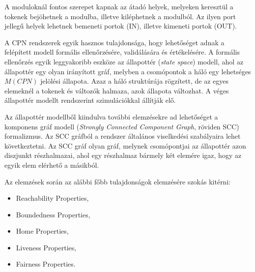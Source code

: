 A moduloknál fontos szerepet kapnak az átadó helyek, melyeken keresztül a tokenek bejöhetnek a modulba, illetve kiléphetnek a modulból. Az ilyen port jellegű helyek lehetnek bemeneti portok (IN), illetve kimeneti portok (OUT).  

A CPN rendszerek egyik hasznos tulajdonsága, hogy lehetőséget adnak a felépített modell formális ellenőrzésére, validálására és értékelésére. A formális ellenőrzés egyik leggyakoribb eszköze az állapottér (\textit{state space})  modell, ahol az állapottér egy olyan irányított gráf, melyben a csomópontok a háló egy lehetséges  $M(CPN)$ jelölési állapota. Azaz a háló struktúrája rögzített, de az egyes elemeknél a tokenek és változók halmaza, azok állapota változhat. A véges állapottér modellt rendszerint szimulációkkal állítják elő. 

Az állapottér modellből kiindulva további elemzésekre ad lehetőséget a komponens gráf modell (\textit{Strongly Connected Component Graph}, röviden SCC) formalizmus. Az SCC gráfból a rendszer általános viselkedési szabályaira lehet következtetni. Az SCC gráf olyan gráf, melynek csomópontjai az állapottér azon diszjunkt részhalmazai, ahol egy részhalmaz bármely két elemére igaz, hogy az egyik elem  elérhető a másikból. 

Az elemzések során az alábbi főbb tulajdonságok elemzésére szokás kitérni:
\begin{itemize}
\item Reachability Properties,
\item Boundedness Properties,
\item Home Properties,
\item Liveness Properties,
\item Fairness Properties.
\end{itemize}


